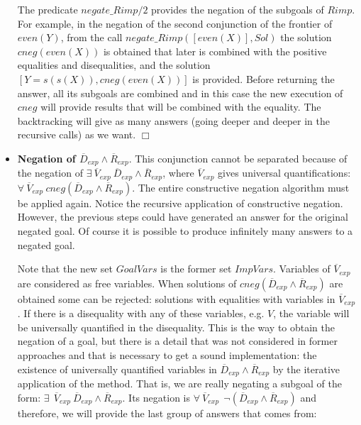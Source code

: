 \documentclass{tlp}
\newcommand{\implementation}[1]{\noindent{\sc Implementation details:}
  #1 $\Box$}
\begin{document}
\begin{itemize}
\implementation{
The predicate $negate\_Rimp/2$ provides the
negation of the subgoals of $Rimp$. For example, in the negation of the second
conjunction of the frontier of $even(Y)$, from the call
$negate\_Rimp([even(X)],Sol)$ the solution $cneg(even(X))$ is obtained
that later is combined with the positive equalities and disequalities, and the
solution $[Y=s(s(X)),cneg(even(X))]$ is provided. Before returning the answer,
all its subgoals are combined and in this case the new execution of $cneg$
will provide results that will be combined with the equality. The backtracking
will give as many answers (going deeper and deeper in the recursive calls)
as we want.
}

           \item {\bf Negation of $\overline{D}_{exp} \wedge
           \overline{R}_{exp}$}. This conjunction cannot be separated
           because of the negation of $ \exists~ \overline{V}_{exp}~
           \overline{D}_{exp} \wedge \overline{R}_{exp}$, where
           $\overline{V}_{exp}$ gives universal quantifications:\\
           $\forall~ \overline{V}_{exp}~ cneg(\overline{D}_{exp}
           \wedge \overline{R}_{exp})$. The entire constructive
           negation algorithm must be applied again. Notice the
           recursive application of constructive negation. However,
           the previous steps could have generated an answer for the
           original negated goal. Of course it is possible to produce
           infinitely many answers to a negated goal.

           Note that the new set $GoalVars$ is the former set
           $ImpVars$. Variables of $\overline{V}_{exp}$ are considered
           as free variables. When solutions of
           $cneg(\overline{D}_{exp} \wedge \overline{R}_{exp})$ are
           obtained some can be rejected: solutions with equalities
           with variables in $\overline{V}_{exp}$. If there is a
           disequality with any of these variables, e.g. $V$, the
           variable will be universally quantified in the disequality.
           This is the way to obtain the negation of a goal, but there
           is a detail that was not considered in former approaches
           and that is necessary to get a sound implementation: the
           existence of universally quantified variables in
           $\overline{D}_{exp} \wedge \overline{R}_{exp}$ by the
           iterative application of the method. That is, we are really
           negating a subgoal of the form: $ \exists~~
           \overline{V}_{exp}~ \overline{D}_{exp} \wedge
           \overline{R}_{exp}$. Its negation is $\forall~
           \overline{V}_{exp}~~ \neg(\overline{D}_{exp} \wedge
           \overline{R}_{exp})$ and therefore, we will provide the
           last group of answers that comes from:


\end{itemize}
\end{document}
